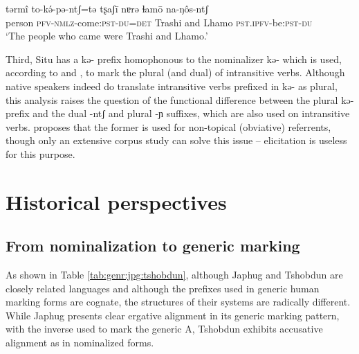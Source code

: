 \documentclass[oldfontcommands,oneside,a4paper,11pt]{article}
\newcommand{\ipa}[1]{{\phon \mbox{#1}}} %
\begin{document}
 \begin{exe}
\ex \label{ex:situ.tokEpEntS}
\gll
\ipa{tərmî}  	\ipa{to-kə́-pə-ntʃ=tə}  	\ipa{tʂaʃī}  	\ipa{nɐrə}  	\ipa{ɬamō}  	\ipa{na-ŋôs-ntʃ}  	\\
person \textsc{pfv-nmlz}-come:\textsc{pst}-\textsc{du=det} Trashi and Lhamo \textsc{pst.ipfv}-be:\textsc{pst}-\textsc{du} \\
\glt `The people who came were Trashi and Lhamo.'
  \end{exe}

Third, Situ has a   \ipa{kə-} prefix homophonous to the nominalizer \ipa{kə-} which is used, according to \citealt[218]{linxr93jiarong} and \citet[163]{lin09phd}, to mark the plural (and dual) of intransitive verbs. Although native speakers indeed do translate intransitive verbs prefixed in \ipa{kə-} as plural, this analysis raises the question of the functional difference between the plural \ipa{kə-} prefix and the dual \ipa{-ntʃ}  and plural \ipa{-ɲ} suffixes, which are also used on intransitive verbs. \citet[101-102]{jacques12agreement} proposes that the former is used for non-topical (obviative) referrents, though only an extensive corpus study can solve this issue -- elicitation is useless for this purpose.

\section{Historical perspectives}
\subsection{From nominalization to generic marking} \label{sec:nmlz2genr}
As shown in Table \ref{tab:genr:jpg:tshobdun}, although Japhug and Tshobdun are closely related languages and although the prefixes used in generic human marking forms are cognate, the structures of their systems are radically different. While Japhug presents clear ergative alignment in its generic marking pattern, with the inverse used to mark the generic A, Tshobdun exhibits accusative alignment as in nominalized forms.
\end{document}
